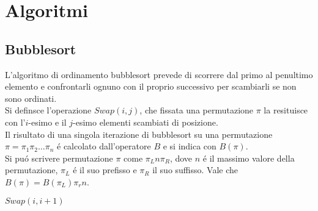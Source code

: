 \section*{Algoritmi}
\subsection*{Bubblesort}
L'algoritmo di ordinamento bubblesort prevede di scorrere dal primo al penultimo elemento e confrontarli ognuno con il proprio successivo per scambiarli se non sono ordinati.\\
Si definsce l'operazione $Swap(i,j)$, che fissata una permutazione $\pi$ la resituisce con l'$i$-esimo e il $j$-esimo elementi scambiati di posizione. \\
Il risultato di una singola iterazione di bubblesort su una permutazione $\pi=\pi_1\pi_2\dots\pi_n$ \'e calcolato dall'operatore $B$ e si indica con $B(\pi)$.\\
Si pu\'o scrivere permutazione $\pi$ come $\pi_Ln\pi_R$, dove $n$ \'e il massimo valore della permutazione, $\pi_L$ \'e il suo prefisso e $\pi_R$ il suo suffisso. Vale che $B(\pi) = B(\pi_L)\pi_rn$.\\
\begin{algorithm}[H]
   \caption{$B - bubblesort$}
\begin{algorithmic}[1]
   \State $Swap(i,i+1)$
   \EndIf
   \EndFor
\end{algorithmic}
\end{algorithm}
